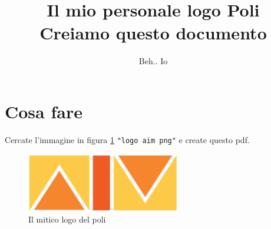 \documentclass[]{article}
\title{ {\huge \bf Il mio personale logo Poli} \\ Creiamo questo documento}
\author{Beh.. Io}
\begin{document}
\maketitle
\clearpage
\section{Cosa fare}

Cercate l'immagine in figura \ref{aim-logo} \texttt{"logo aim png"} e create questo pdf.

\begin{figure}
\centering
\includegraphics[width=0.6\textwidth]{logo-aim}
\caption{Il mitico logo del poli}
\label{aim-logo}
\end{figure}
\end{document}
